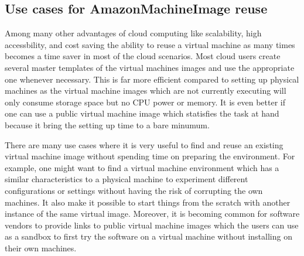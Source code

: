 \subsection{Use cases for AmazonMachineImage reuse}
Among many other advantages of cloud computing like scalability, high accessbility, and cost saving the ability to reuse a virtual machine as many times becomes a time saver in most of the cloud scenarios. Most cloud users create several master templates of the virtual machines images and use the appropriate one whenever necessary. This is far more efficient compared to setting up physical machines as the virtual machine images which are not currently executing will only consume storage space but no CPU power or memory. It is even better if one can use a public virtual machine image which statisfies the task at hand because it bring the setting up time to a bare minumum. 

There are many use cases where it is very useful to find and reuse an existing virtual machine image without spending time on preparing the environment. For example, one might want to find a virtual machine environment which has a similar characteristics to a physical machine to experiment different configurations or settings without having the risk of corrupting the own machines. It also make it possible to start things from the scratch with another instance of the same virtual image. Moreover, it is becoming common for software vendors to provide links to public virtual machine images which the users can use as a sandbox to first try the software on a virtual machine without installing on their own machines.    

